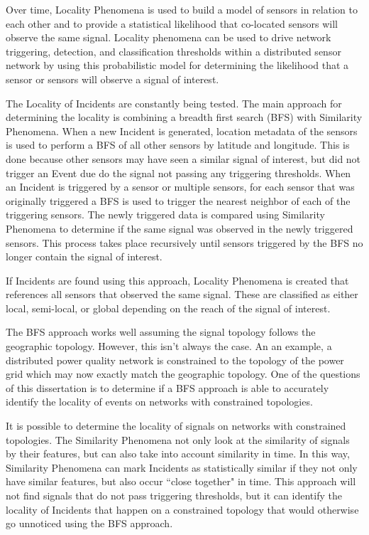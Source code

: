 Over time, Locality Phenomena is used to build a model of sensors in relation to each other and to provide a statistical likelihood that co-located sensors will observe the same signal. Locality phenomena can be used to drive network triggering, detection, and classification thresholds within a distributed sensor network by using this probabilistic model for determining the likelihood that a sensor or sensors will observe a signal of interest.

The Locality of Incidents are constantly being tested. The main approach for determining the locality is combining a breadth first search (BFS) with Similarity Phenomena. When a new Incident is generated, location metadata of the sensors is used to perform a BFS of all other sensors by latitude and longitude. This is done because other sensors may have seen a similar signal of interest, but did not trigger an Event due do the signal not passing any triggering thresholds. When an Incident is triggered by a sensor or multiple sensors, for each sensor that was originally triggered a BFS is used to trigger the nearest neighbor of each of the triggering sensors. The newly triggered data is compared using Similarity Phenomena to determine if the same signal was observed in the newly triggered sensors. This process takes place recursively until sensors triggered by the BFS no longer contain the signal of interest.

If Incidents are found using this approach, Locality Phenomena is created that references all sensors that observed the same signal. These are classified as either local, semi-local, or global depending on the reach of the signal of interest.

The BFS approach works well assuming the signal topology follows the geographic topology. However, this isn't always the case. An an example, a distributed power quality network is constrained to the topology of the power grid which may now exactly match the geographic topology. One of the questions of this dissertation is to determine if a BFS approach is able to accurately identify the locality of events on networks with constrained topologies.

It is possible to determine the locality of signals on networks with constrained topologies. The Similarity Phenomena not only look at the similarity of signals by their features, but can also take into account similarity in time. In this way, Similarity Phenomena can mark Incidents as statistically similar if they not only have similar features, but also occur ``close together" in time. This approach will not find signals that do not pass triggering thresholds, but it can identify the locality of Incidents that happen on a constrained topology that would otherwise go unnoticed using the BFS approach.


